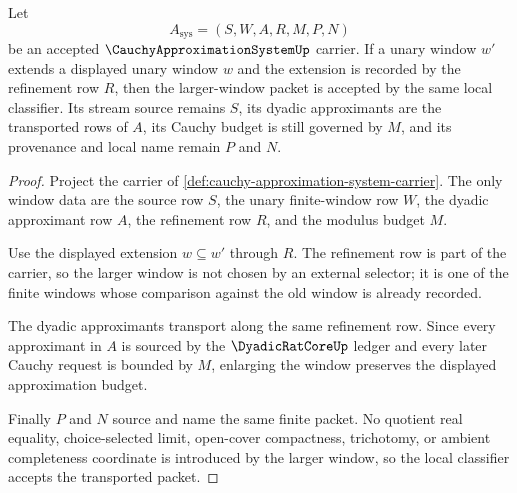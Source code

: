 \begin{theorem}
\label{thm:cauchy-approximation-system-window-refinement}
Let
$$
A_{\mathrm{sys}}=(S,W,A,R,M,P,N)
$$
be an accepted $\CauchyApproximationSystemUp$ carrier. If a unary window $w'$ extends a displayed unary window $w$ and the extension is recorded by the refinement row $R$, then the larger-window packet is accepted by the same local classifier. Its stream source remains $S$, its dyadic approximants are the transported rows of $A$, its Cauchy budget is still governed by $M$, and its provenance and local name remain $P$ and $N$.
\end{theorem}
\begin{proof}
Project the carrier of \autoref{def:cauchy-approximation-system-carrier}. The only window data are the source row $S$, the unary finite-window row $W$, the dyadic approximant row $A$, the refinement row $R$, and the modulus budget $M$.

Use the displayed extension $w\subseteq w'$ through $R$. The refinement row is part of the carrier, so the larger window is not chosen by an external selector; it is one of the finite windows whose comparison against the old window is already recorded.

The dyadic approximants transport along the same refinement row. Since every approximant in $A$ is sourced by the $\DyadicRatCoreUp$ ledger and every later Cauchy request is bounded by $M$, enlarging the window preserves the displayed approximation budget.

Finally $P$ and $N$ source and name the same finite packet. No quotient real equality, choice-selected limit, open-cover compactness, trichotomy, or ambient completeness coordinate is introduced by the larger window, so the local classifier accepts the transported packet.
\end{proof}

